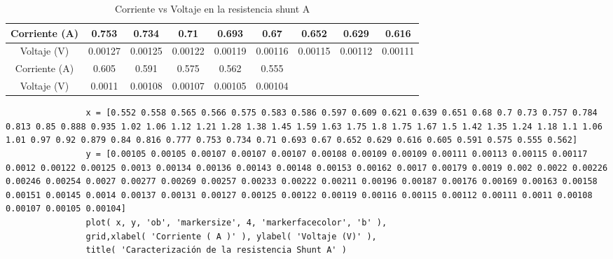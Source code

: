\begin{table} [H]
\begin{center}
\begin{tabular}{ |c|c|c|c|c|c|c|c|c| }
                        \hline
                        \hline 
                        Corriente (A) & 0.753 & 0.734 & 0.71 & 0.693 & 0.67 & 0.652 & 0.629 & 0.616\\
                        \hline
                        Voltaje (V) & 0.00127 & 0.00125 & 0.00122 & 0.00119 & 0.00116 & 0.00115 & 0.00112 & 0.00111\\
                        \hline
                        \hline
                        Corriente (A) & 0.605 & 0.591 & 0.575 & 0.562 & 0.555 \\
                        \hline
                        Voltaje (V) & 0.0011 & 0.00108 & 0.00107 & 0.00105 & 0.00104 \\ 
                        \hline
                    \end{tabular}
                \end{center}
                \caption{Corriente vs Voltaje en la resistencia shunt A}
                \label{tab:shuntA}
            \end{table}

            \begin{lstlisting}
                x = [0.552 0.558 0.565 0.566 0.575 0.583 0.586 0.597 0.609 0.621 0.639 0.651 0.68 0.7 0.73 0.757 0.784 0.813 0.85 0.888 0.935 1.02 1.06 1.12 1.21 1.28 1.38 1.45 1.59 1.63 1.75 1.8 1.75 1.67 1.5 1.42 1.35 1.24 1.18 1.1 1.06 1.01 0.97 0.92 0.879 0.84 0.816 0.777 0.753 0.734 0.71 0.693 0.67 0.652 0.629 0.616 0.605 0.591 0.575 0.555 0.562]
                y = [0.00105 0.00105 0.00107 0.00107 0.00107 0.00108 0.00109 0.00109 0.00111 0.00113 0.00115 0.00117 0.0012 0.00122 0.00125 0.0013 0.00134 0.00136 0.00143 0.00148 0.00153 0.00162 0.0017 0.00179 0.0019 0.002 0.0022 0.00226 0.00246 0.00254 0.0027 0.00277 0.00269 0.00257 0.00233 0.00222 0.00211 0.00196 0.00187 0.00176 0.00169 0.00163 0.00158 0.00151 0.00145 0.0014 0.00137 0.00131 0.00127 0.00125 0.00122 0.00119 0.00116 0.00115 0.00112 0.00111 0.0011 0.00108 0.00107 0.00105 0.00104]
                plot( x, y, 'ob', 'markersize', 4, 'markerfacecolor', 'b' ),
                grid,xlabel( 'Corriente ( A )' ), ylabel( 'Voltaje (V)' ),
                title( 'Caracterización de la resistencia Shunt A' )
            \end{lstlisting}

